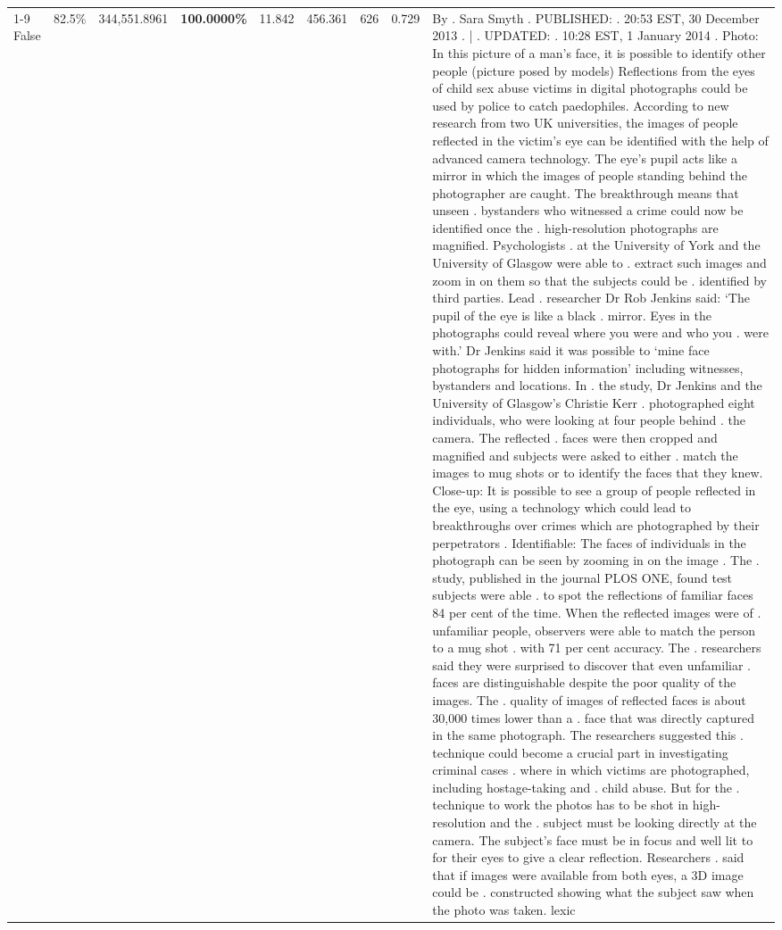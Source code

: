 \begin{table}[H]
\begin{tabular}{lllrlllll}
\cline{1-9}
False & 82.5\% & 344,551.8961 & \bfseries \color{red} 100.0000\% & 11.842 & 456.361 & 626 & 0.729 & By . Sara Smyth . PUBLISHED: . 20:53 EST, 30 December 2013 . | . UPDATED: . 10:28 EST, 1 January 2014 . Photo: In this picture of a man's face, it is possible to identify other people (picture posed by models) Reflections from the eyes of child sex abuse victims in digital photographs could be used by police to catch paedophiles. According to new research from two UK universities, the images of people reflected in the victim's eye can be identified with the help of advanced camera technology. The eye's pupil acts like a mirror in which the images of people standing behind the photographer are caught. The breakthrough means that unseen . bystanders who witnessed a crime could now be identified once the . high-resolution photographs are magnified. Psychologists . at the University of York and the University of Glasgow were able to . extract such images and zoom in on them so that the subjects could be . identified by third parties. Lead . researcher Dr Rob Jenkins said: ‘The pupil of the eye is like a black . mirror. Eyes in the photographs could reveal where you were and who you . were with.' Dr Jenkins said it was possible to ‘mine face photographs for hidden information' including witnesses, bystanders and locations. In . the study, Dr Jenkins and the University of Glasgow's Christie Kerr . photographed eight individuals, who were looking at four people behind . the camera. The reflected . faces were then cropped and magnified and subjects were asked to either . match the images to mug shots or to identify the faces that they knew. Close-up: It is possible to see a group of people reflected in the eye, using a technology which could lead to breakthroughs over crimes which are photographed by their perpetrators . Identifiable: The faces of individuals in the photograph can be seen by zooming in on the image . The . study, published in the journal PLOS ONE, found test subjects were able . to spot the reflections of familiar faces 84 per cent of the time. When the reflected images were of . unfamiliar people, observers were able to match the person to a mug shot . with 71 per cent accuracy. The . researchers said they were surprised to discover that even unfamiliar . faces are distinguishable despite the poor quality of the images. The . quality of images of reflected faces is about 30,000 times lower than a . face that was directly captured in the same photograph. The researchers suggested this . technique could become a crucial part in investigating criminal cases . where in which victims are photographed, including hostage-taking and . child abuse. But for the . technique to work the photos has to be shot in high-resolution and the . subject must be looking directly at the camera. The subject's face must be in focus and well lit to for their eyes to give a clear reflection. Researchers . said that if images were available from both eyes, a 3D image could be . constructed showing what the subject saw when the photo was taken. lexic \\

\end{tabular}
\end{table}
